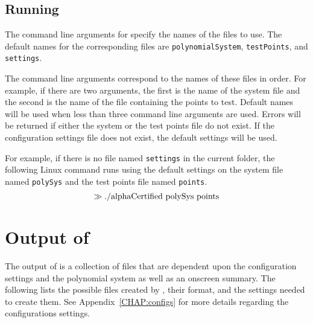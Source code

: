 \documentclass[11pt]{report}
\begin{document}
\subsection{Running \alphaCertified}\label{SEC:Run}

The command line arguments for \alphaCertifiedS specify the names
of the files to use.  The default names for the corresponding
files are {\tt polynomialSystem}, {\tt testPoints}, and {\tt settings}.

The command line arguments correspond to the names of these files in order.
For example, if there are two arguments, the first is the name of the
system file and the second is the name of the file containing the points to test.
Default names will be used when less than three command line arguments are used.
Errors will be returned if either the system or the
test points file do not exist.  If the configuration settings file does not exist,
the default settings will be used.

For example, if there is no file named {\tt settings} in the current folder,
the following Linux command runs \alphaCertifiedS using the default settings
on the system file named {\tt polySys}
and the test points file named {\tt points}.
$$\gg \hbox{./alphaCertified polySys points}$$

\section{Output of \alphaCertified}\label{CHAP:output}

The output of \alphaCertifiedS is a collection of files that are dependent
upon the configuration settings and the polynomial system as well as an onscreen
summary.  The following lists the possible files created by \alphaCertified,
their format, and the settings needed to create them.  See Appendix~\ref{CHAP:configs}
for more details regarding the configurations settings.
\end{document}
